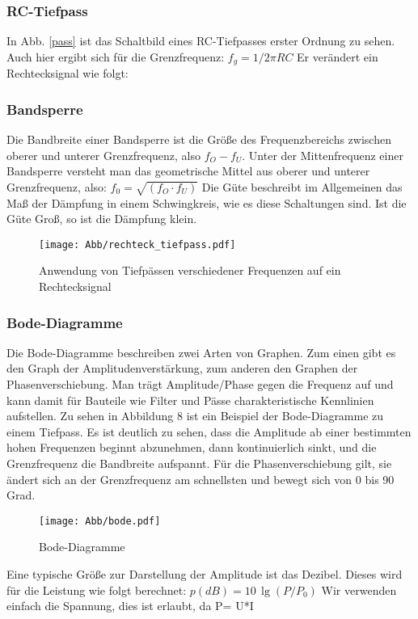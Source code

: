 \subsubsection{RC-Tiefpass}

In Abb. \ref{pass} ist das Schaltbild eines RC-Tiefpasses erster Ordnung zu sehen. Auch hier ergibt sich für die Grenzfrequenz: $f_g=1/2 \pi RC$
Er verändert ein Rechtecksignal wie folgt:

\subsubsection{Bandsperre}
Die Bandbreite einer Bandsperre ist die Größe des Frequenzbereichs zwischen oberer und unterer Grenzfrequenz, also $f_O -f_U$.
Unter der Mittenfrequenz einer Bandsperre versteht man das geometrische Mittel aus oberer und unterer Grenzfrequenz, also: $f_0=\sqrt{(f_O \cdot f_U)}$
Die Güte beschreibt im Allgemeinen das Maß der Dämpfung in einem Schwingkreis, wie es diese Schaltungen sind.
Ist die Güte Groß, so ist die Dämpfung klein.
\begin{figure}[H]
    \centering
	\texttt{[image: Abb/rechteck\_tiefpass.pdf]} 
    \caption{Anwendung von Tiefpässen verschiedener Frequenzen auf ein Rechtecksignal}
\end{figure}

\subsubsection{Bode-Diagramme}
Die Bode-Diagramme beschreiben zwei Arten von Graphen. Zum einen gibt es den Graph der Amplitudenverstärkung, zum anderen den Graphen der Phasenverschiebung. Man trägt Amplitude/Phase gegen die Frequenz auf und kann damit für Bauteile wie Filter und Pässe charakteristische Kennlinien aufstellen. Zu sehen in Abbildung 8 ist ein Beispiel der Bode-Diagramme zu einem Tiefpass. Es ist deutlich zu sehen, dass die Amplitude ab einer bestimmten hohen Frequenzen beginnt abzunehmen, dann kontinuierlich sinkt, und die Grenzfrequenz die Bandbreite aufspannt. Für die Phasenverschiebung gilt, sie ändert sich an der Grenzfrequenz am schnellsten und bewegt sich von 0 bis 90 Grad.
\begin{figure}[H]
    \centering
    \texttt{[image: Abb/bode.pdf]}
    \caption{Bode-Diagramme} 
\end{figure}

Eine typische Größe zur Darstellung der Amplitude ist das Dezibel. Dieses wird für die Leistung wie folgt berechnet:
$p(dB)=10 \, \lg(P/P_0)$
Wir verwenden einfach die Spannung, dies ist erlaubt, da P= U*I

